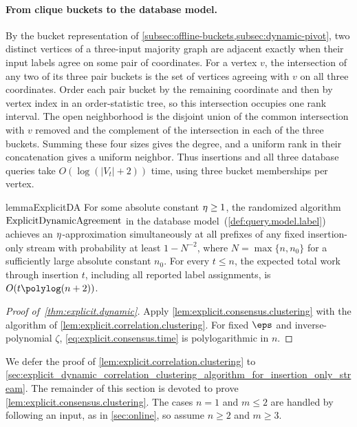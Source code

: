 \paragraph{From clique buckets to the database model.}\label{par:explicit.bucket.queries}
By the bucket representation of \cref{subsec:offline-buckets,subsec:dynamic-pivot}, two distinct vertices of a three-input majority graph are adjacent exactly when their input labels agree on some pair of coordinates.
For a vertex $ v $, the intersection of any two of its three pair buckets is the set of vertices agreeing with $ v $ on all three coordinates.
Order each pair bucket by the remaining coordinate and then by vertex index in an order-statistic tree, so this intersection occupies one rank interval.
The open neighborhood is the disjoint union of the common intersection with $ v $ removed and the complement of the intersection in each of the three buckets.
Summing these four sizes gives the degree, and a uniform rank in their concatenation gives a uniform neighbor.
Thus insertions and all three database queries take $ O(\log(|V_t|+2)) $ time, using three bucket memberships per vertex.

\begin{restatable}{lemma}{ExplicitDA}\label{lem:explicit.correlation.clustering}
For some absolute constant $ \eta\ge1 $, the randomized algorithm $ \mathrm{ExplicitDynamicAgreement} $ in the database model~(\cref{def:query.model.label}) achieves an $ \eta $-approximation simultaneously at all prefixes of any fixed insertion-only stream with probability at least $ 1-N^{-2} $, where $ N=\max\{n,n_0\} $ for a sufficiently large absolute constant $ n_0 $.
For every $ t\le n $, the expected total work through insertion $ t $, including all reported label assignments, is $ O(t\polylog(n+2)) $.
\end{restatable}

\begin{proof}[Proof of~\cref{thm:explicit.dynamic}]
Apply \cref{lem:explicit.consensus.clustering} with the algorithm of \cref{lem:explicit.correlation.clustering}.
For fixed $ \eps $ and inverse-polynomial $ \zeta $, \eqref{eq:explicit.consensus.time} is polylogarithmic in $ n $.
\end{proof}

We defer the proof of \cref{lem:explicit.correlation.clustering} to \cref{sec:explicit_dynamic_correlation_clustering_algorithm_for_insertion_only_stream}.
The remainder of this section is devoted to prove \cref{lem:explicit.consensus.clustering}.
The cases $ n=1 $ and $ m\le2 $ are handled by following an input, as in \cref{sec:online}, so assume $ n\ge2 $ and $ m\ge3 $.

